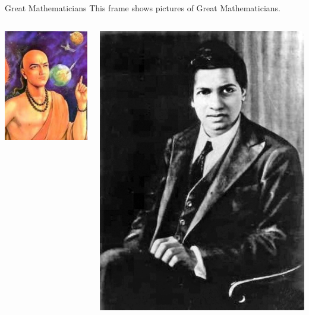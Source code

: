 \documentclass{beamer}
\begin{document}
\begin{frame}{Great Mathematicians}
    This frame shows pictures of Great Mathematicians.
    \begin{columns}
        \hspace{2.5em}
        \begin{column}{0.3\textwidth}
            \includegraphics[scale=0.39]{aryabhatta.jpeg}
        \end{column}
        \begin{column}{0.8\textwidth}
            \includegraphics[scale=0.09]{Srinivasa.jpg}

\end{column}
\end{columns}
\end{frame}
\end{document}
